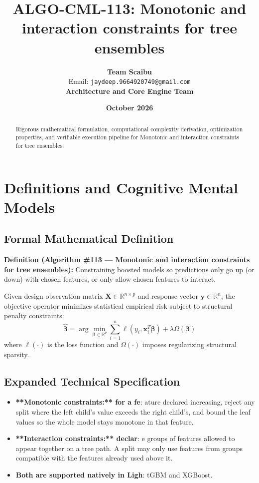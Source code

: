 \documentclass[11pt,a4paper]{article}
\title{\textbf{ALGO-CML-113: Monotonic and interaction constraints for tree ensembles}}
\author{\textbf{Team Scaibu} \\ \small Email: \texttt{jaydeep.9664920749@gmail.com} \\ \small \textbf{Architecture and Core Engine Team}}
\date{\textbf{October 2026}}
\theoremstyle{definition}
\begin{document}
\maketitle

\begin{abstract}
Rigorous mathematical formulation, computational complexity derivation, optimization properties, and verifiable execution pipeline for Monotonic and interaction constraints for tree ensembles.
\end{abstract}

\section{Definitions and Cognitive Mental Models}

\subsection{Formal Mathematical Definition}
\textbf{Definition (Algorithm \#113 --- Monotonic and interaction constraints for tree ensembles):}
Constraining boosted models so predictions only go up (or down) with chosen features, or only allow chosen features to interact.

Given design observation matrix $\mathbf{X} \in \mathbb{R}^{n \times p}$ and response vector $\mathbf{y} \in \mathbb{R}^n$, the objective operator minimizes statistical empirical risk subject to structural penalty constraints:
\begin{equation}
\hat{\boldsymbol{\beta}} = \arg\min_{\boldsymbol{\beta} \in \mathbb{R}^p} \sum_{i=1}^n \ell(y_i, \mathbf{x}_i^T \boldsymbol{\beta}) + \lambda \Omega(\boldsymbol{\beta})
\end{equation}
where $\ell(\cdot)$ is the loss function and $\Omega(\cdot)$ imposes regularizing structural sparsity.

\subsection{Expanded Technical Specification}
\begin{itemize}
\item \textbf{**Monotonic constraints:** for a fe}: ature declared increasing, reject any split where the left child's value exceeds the right child's, and bound the leaf values so the whole model stays monotone in that feature.
\item \textbf{**Interaction constraints:** declar}: e groups of features allowed to appear together on a tree path. A split may only use features from groups compatible with the features already used above it.
\item \textbf{Both are supported natively in Ligh}: tGBM and XGBoost.
\end{itemize}
\end{document}
